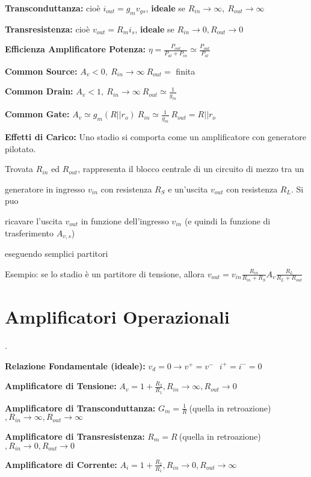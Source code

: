 \documentclass[12pt]{extarticle}
\begin{document}
{\bf Transconduttanza:} cioè $ i_{out} = g_mv_{gs} $, {\bf ideale} se $R_{in} \to \infty, \ R_{out} \to \infty$

{\bf Transresistenza:} cioè $ v_{out} = R_mi_s$, {\bf ideale} se $R_{in} \to 0, R_{out} \to 0$ 

{\bf Efficienza Amplificatore Potenza:} $\displaystyle \eta = \frac{P_{out}}{P_{al}+P_{in}} \simeq \frac{P_{out}}{P_{al}}$ 

{\bf Common Source:} $ A_v < 0, \ R_{in} \to \infty \ R_{out} = $ finita 

{\bf Common Drain:} $ A_v < 1, \ R_{in} \to \infty \ R_{out} \simeq \frac{1}{g_m}$	

{\bf Common Gate:} $ A_v \simeq g_m(R || r_o) \ R_{in} \simeq \frac{1}{g_m} \ R_{out} = R || r_o$

{\bf Effetti di Carico:} Uno stadio si comporta come un amplificatore con generatore pilotato.

Trovata $R_{in}$ ed $R_{out}$, rappresenta il blocco centrale di un circuito di mezzo tra un 

generatore in ingresso $v_{in}$ con resistenza $R_S$ e un'uscita $v_{out}$ con resistenza $R_L$. Si puo

ricavare l'uscita $v_{out}$ in funzione dell'ingresso $v_{in}$ (e quindi la funzione di trasferimento $A_{v,s}$)

eseguendo semplici partitori 

Esempio: se lo stadio è un partitore di tensione, allora $\displaystyle v_{out} = v_{in}\frac{R_{in}}{R_{in}+R_S}A_v\frac{R_L}{R_L+R_{out}}$


\section{Amplificatori Operazionali}.

{\bf Relazione Fondamentale (ideale):} $\displaystyle v_d = 0 \to v^+ = v^- \ \ \ i^+ = i^- = 0$

{\bf Amplificatore di Tensione:} $\displaystyle A_v = 1+\frac{R_2}{R_1}, R_{in} \to \infty, R_{out} \to 0$

{\bf Amplificatore di Transconduttanza:} $\displaystyle G_m = \frac{1}{R} \ $(quella in retroazione)$, R_{in} \to \infty, R_{out} \to \infty$

{\bf Amplificatore di Transresistenza: } $\displaystyle R_m = R \ $(quella in retroazione)$, R_{in} \to 0, R_{out} \to 0$

{\bf Amplificatore di Corrente:} $\displaystyle A_i = 1+\frac{R_2}{R_1}, R_{in} \to 0, R_{out} \to \infty$
\end{document}
